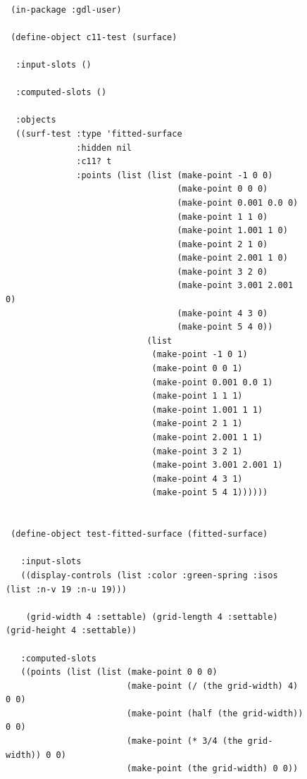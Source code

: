 \documentclass [11pt]{book}
\begin{document}
\begin{itemize}
\begin{figure}
\begin{lrbox}{\boxedverb}
\begin{minipage}{\linewidth}
{\small

\begin{verbatim}

 (in-package :gdl-user)

 (define-object c11-test (surface) 

  :input-slots () 

  :computed-slots ()

  :objects
  ((surf-test :type 'fitted-surface
              :hidden nil
              :c11? t
              :points (list (list (make-point -1 0 0)
                                  (make-point 0 0 0) 
                                  (make-point 0.001 0.0 0)
                                  (make-point 1 1 0)
                                  (make-point 1.001 1 0)
                                  (make-point 2 1 0)
                                  (make-point 2.001 1 0)
                                  (make-point 3 2 0)
                                  (make-point 3.001 2.001 0)
                                  (make-point 4 3 0) 
                                  (make-point 5 4 0))   
                            (list
                             (make-point -1 0 1)
                             (make-point 0 0 1) 
                             (make-point 0.001 0.0 1)
                             (make-point 1 1 1)
                             (make-point 1.001 1 1)
                             (make-point 2 1 1)
                             (make-point 2.001 1 1)
                             (make-point 3 2 1)
                             (make-point 3.001 2.001 1)
                             (make-point 4 3 1)
                             (make-point 5 4 1))))))


 (define-object test-fitted-surface (fitted-surface) 

   :input-slots
   ((display-controls (list :color :green-spring :isos (list :n-v 19 :n-u 19)))
   
    (grid-width 4 :settable) (grid-length 4 :settable) (grid-height 4 :settable))
  
   :computed-slots
   ((points (list (list (make-point 0 0 0)
                        (make-point (/ (the grid-width) 4) 0 0)
                        (make-point (half (the grid-width)) 0 0)
                        (make-point (* 3/4 (the grid-width)) 0 0)
                        (make-point (the grid-width) 0 0))
                         

\end{verbatim}}
\end{minipage}
\end{lrbox}
\end{figure}
\end{itemize}
\end{document}
